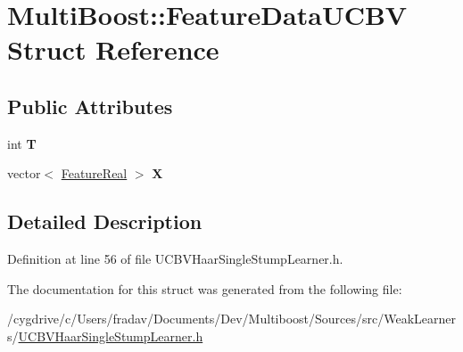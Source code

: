 \hypertarget{structMultiBoost_1_1FeatureDataUCBV}{
\section{MultiBoost::FeatureDataUCBV Struct Reference}
\label{structMultiBoost_1_1FeatureDataUCBV}
}
\subsection*{Public Attributes}
\begin{DoxyCompactItemize}
\item 
\hypertarget{structMultiBoost_1_1FeatureDataUCBV_aeecad3af86e208d283c0b621fa84b183}{
int {\bfseries T}}
\label{structMultiBoost_1_1FeatureDataUCBV_aeecad3af86e208d283c0b621fa84b183}

\item 
\hypertarget{structMultiBoost_1_1FeatureDataUCBV_aec0878eddb9fb60b0e7750ef68828646}{
vector$<$ \hyperlink{Defaults_8h_a3a11cfe6a5d469d921716ca6291e934f}{FeatureReal} $>$ {\bfseries X}}
\label{structMultiBoost_1_1FeatureDataUCBV_aec0878eddb9fb60b0e7750ef68828646}

\end{DoxyCompactItemize}


\subsection{Detailed Description}


Definition at line 56 of file UCBVHaarSingleStumpLearner.h.



The documentation for this struct was generated from the following file:\begin{DoxyCompactItemize}
\item 
/cygdrive/c/Users/fradav/Documents/Dev/Multiboost/Sources/src/WeakLearners/\hyperlink{UCBVHaarSingleStumpLearner_8h}{UCBVHaarSingleStumpLearner.h}\end{DoxyCompactItemize}
